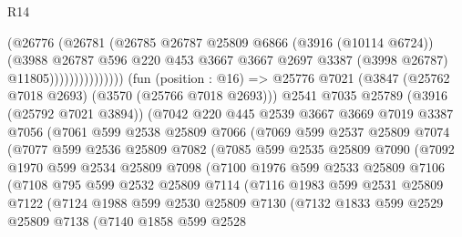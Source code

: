 \begin{lexlean}{R14}
\begin{coremodule}
                          (@26776
                            (@26781
                              (@26785
                                @26787
                                @25809
                                @6866
                                (@3916 (@10114 @6724))
                                (@3988
                                  @26787
                                  @596
                                  @220
                                  @453
                                  @3667
                                  @3667
                                  @2697
                                  @3387
                                  (@3998 @26787)
                                  @11805)))))))))))))))
    (fun (position : @16) =>
    @25776
      @7021
      (@3847 (@25762 @7018 @2693) (@3570 (@25766 @7018 @2693)))
      @2541
      @7035
      @25789
      (@3916 (@25792 @7021 @3894))
      (@7042
        @220
        @445
        @2539
        @3667
        @3669
        @7019
        @3387
        @7056
        (@7061
          @599
          @2538
          @25809
          @7066
          (@7069
            @599
            @2537
            @25809
            @7074
            (@7077
              @599
              @2536
              @25809
              @7082
              (@7085
                @599
                @2535
                @25809
                @7090
                (@7092
                  @1970
                  @599
                  @2534
                  @25809
                  @7098
                  (@7100
                    @1976
                    @599
                    @2533
                    @25809
                    @7106
                    (@7108
                      @795
                      @599
                      @2532
                      @25809
                      @7114
                      (@7116
                        @1983
                        @599
                        @2531
                        @25809
                        @7122
                        (@7124
                          @1988
                          @599
                          @2530
                          @25809
                          @7130
                          (@7132
                            @1833
                            @599
                            @2529
                            @25809
                            @7138
                            (@7140
                              @1858
                              @599
                              @2528

\end{coremodule}
\end{lexlean}
